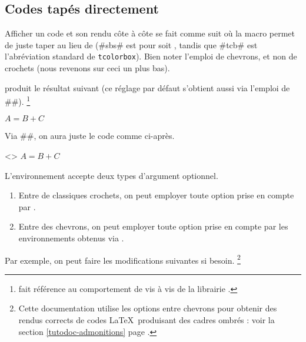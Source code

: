 \subsection{Codes tapés directement}
\label{tutodoc-listing-latex-direct}

\begin{tdocexa}
    Afficher un code et son rendu côte à côte se fait comme suit où la macro  permet de juste taper  au lieu de  (\tdoclatexin#sbs# est pour  soit , tandis que \tdoclatexin#tcb# est l'abréviation standard de \texttt{tcolorbox}). Bien noter l'emploi de chevrons, et non de crochets (nous revenons sur ceci un plus bas).

\end{tdocexa}


\begin{tdocexa}[À la suite]
     produit le résultat suivant (ce réglage par défaut s'obtient aussi via l'emploi de \tdoclatexin##).%
    \footnote{
         fait référence au comportement  de  vis à vis de la librairie .
    }

    \begin{tdoclatex}
$A = B + C$
    \end{tdoclatex}
\end{tdocexa}


\begin{tdocexa}
    Via \tdoclatexin##, on aura juste le code comme ci-après.

    \begin{tdoclatex}<>
$A = B + C$
    \end{tdoclatex}
\end{tdocexa}


\begin{tdocexa}[Personnaliser]
	L'environnement  accepte deux types d'argument optionnel.
	\begin{enumerate}
		\item Entre de classiques crochets, on peut employer toute option prise en compte par .

        \item Entre des chevrons, on peut employer toute option prise en compte par les environnements obtenus via .
	\end{enumerate}

	Par exemple, on peut faire les modifications suivantes si besoin.%
	\footnote{
		Cette documentation utilise les options entre chevrons pour obtenir des rendus corrects de codes \LaTeX\ produisant des cadres ombrés : voir la section \ref{tutodoc-admonitions} page \pageref{tutodoc-admonitions}.
	}

\end{tdocexa}

